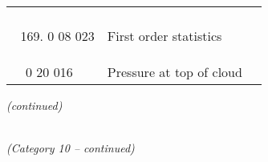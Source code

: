 \begin{longtable}[]{@{}llll@{}}
\begin{minipage}[t]{0.22\columnwidth}
\end{minipage} & \begin{minipage}[t]{0.22\columnwidth}\raggedright
\strut
\end{minipage}\tabularnewline
\begin{minipage}[t]{0.22\columnwidth}\raggedright
\strut
\end{minipage} & \begin{minipage}[t]{0.22\columnwidth}\raggedright
\begin{enumerate}
\setcounter{enumi}{168}
\item
  0 08 023
\end{enumerate}\strut
\end{minipage} & \begin{minipage}[t]{0.22\columnwidth}\raggedright
First order statistics\strut
\end{minipage} & \begin{minipage}[t]{0.22\columnwidth}\raggedright
\strut
\end{minipage}\tabularnewline
& 0 20 016 & Pressure at top of cloud &\tabularnewline
\bottomrule
\end{longtable}

\emph{(continued)}

\emph{\\
(Category 10 -- continued)}

